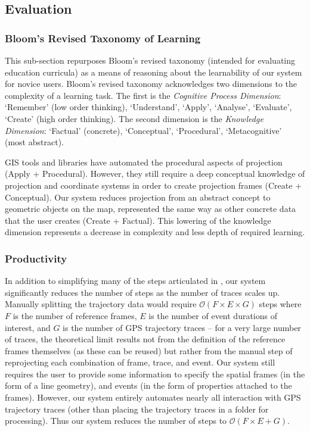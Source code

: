 \subsection{Evaluation}
\label{sec:sigspatialeval}

\subsubsection{Bloom's Revised Taxonomy of Learning}

This sub-section repurposes Bloom's revised taxonomy \cite{anderson_taxonomy_2001} (intended for evaluating education curricula) as a means of reasoning about the learnability of our system for novice users. Bloom's revised taxonomy acknowledges two dimensions to the complexity of a learning task. The first is the \textit{Cognitive Process Dimension}: `Remember' (low order thinking), `Understand', `Apply', `Analyse', `Evaluate', `Create' (high order thinking). The second dimension is the \textit{Knowledge Dimension}: `Factual' (concrete), `Conceptual', `Procedural', `Metacognitive' (most abstract).

GIS tools and libraries have automated the procedural aspects of projection (Apply + Procedural). However, they still require a deep conceptual knowledge of projection and coordinate systems in order to create projection frames (Create + Conceptual). Our system reduces projection from an abstract concept to geometric objects on the map, represented the same way as other concrete data that the user creates (Create + Factual). This lowering of the knowledge dimension represents a decrease in complexity and less depth of required learning.

\subsubsection{Productivity}

In addition to simplifying many of the steps articulated in , our system significantly reduces the number of steps as the number of traces scales up. Manually splitting the trajectory data would require $\mathcal{O}(F \times E \times G)$ steps where $F$ is the number of reference frames, $E$ is the number of event durations of interest, and $G$ is the number of GPS trajectory traces -- for a very large number of traces, the theoretical limit results not from the definition of the reference frames themselves (as these can be reused) but rather from the manual step of reprojecting each combination of frame, trace, and event. Our system still requires the user to provide some information to specify the spatial frames (in the form of a line geometry), and events (in the form of properties attached to the frames). However, our system entirely automates nearly all interaction with GPS trajectory traces (other than placing the trajectory traces in a folder for processing). Thus our system reduces the number of steps to $\mathcal{O}(F \times E + G)$.




